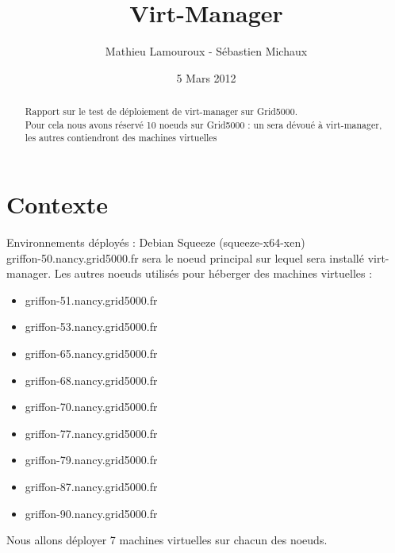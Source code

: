 \documentclass{article}
\begin{document}
\title{Virt-Manager}
\author{Mathieu Lamouroux - Sébastien Michaux}
\date{5 Mars 2012}
\maketitle

\begin{abstract}
Rapport sur le test de déploiement de virt-manager sur Grid5000.\\
Pour cela nous avons réservé 10 noeuds sur Grid5000 : un sera dévoué à virt-manager, les autres contiendront des machines virtuelles
\end{abstract}
\section{Contexte}
Environnements déployés : Debian Squeeze (squeeze-x64-xen) \\
griffon-50.nancy.grid5000.fr sera le noeud principal sur lequel sera installé virt-manager. Les autres noeuds utilisés pour héberger des machines virtuelles :
\begin{itemize}
  \item griffon-51.nancy.grid5000.fr
  \item griffon-53.nancy.grid5000.fr
  \item griffon-65.nancy.grid5000.fr
  \item griffon-68.nancy.grid5000.fr
  \item griffon-70.nancy.grid5000.fr
  \item griffon-77.nancy.grid5000.fr
  \item griffon-79.nancy.grid5000.fr
  \item griffon-87.nancy.grid5000.fr
  \item griffon-90.nancy.grid5000.fr
\end{itemize}
Nous allons déployer 7 machines virtuelles sur chacun des noeuds.
\end{document}

